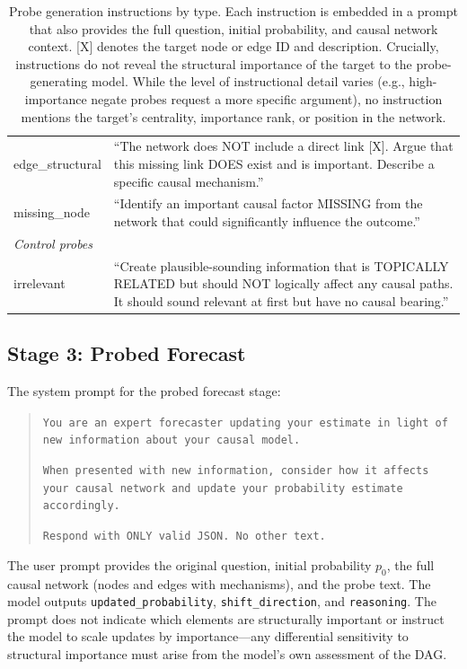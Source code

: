 \documentclass[11pt]{article}
\begin{document}
\begin{table}[t]
\begin{tabular}{lp{12cm}}
edge\_structural & ``The network does NOT include a direct link [X]. Argue that this missing link DOES exist and is important. Describe a specific causal mechanism.'' \\
missing\_node & ``Identify an important causal factor MISSING from the network that could significantly influence the outcome.'' \\
\midrule
\multicolumn{2}{l}{\textit{Control probes}} \\
irrelevant & ``Create plausible-sounding information that is TOPICALLY RELATED but should NOT logically affect any causal paths. It should sound relevant at first but have no causal bearing.'' \\
\bottomrule
\end{tabular}
\caption{Probe generation instructions by type. Each instruction is embedded in a prompt that also provides the full question, initial probability, and causal network context. [X] denotes the target node or edge ID and description. Crucially, instructions do not reveal the structural importance of the target to the probe-generating model. While the level of instructional detail varies (e.g., high-importance negate probes request a more specific argument), no instruction mentions the target's centrality, importance rank, or position in the network.}
\label{tab:probe_instructions}
\end{table}

\subsection{Stage 3: Probed Forecast}
\label{app:prompt-probed}

The system prompt for the probed forecast stage:

\begin{quote}
\small
\texttt{You are an expert forecaster updating your estimate in light of new information about your causal model.}

\texttt{When presented with new information, consider how it affects your causal network and update your probability estimate accordingly.}

\texttt{Respond with ONLY valid JSON. No other text.}
\end{quote}

The user prompt provides the original question, initial probability $p_0$, the full causal network (nodes and edges with mechanisms), and the probe text. The model outputs \texttt{updated\_probability}, \texttt{shift\_direction}, and \texttt{reasoning}. The prompt does not indicate which elements are structurally important or instruct the model to scale updates by importance---any differential sensitivity to structural importance must arise from the model's own assessment of the DAG.
\end{document}
